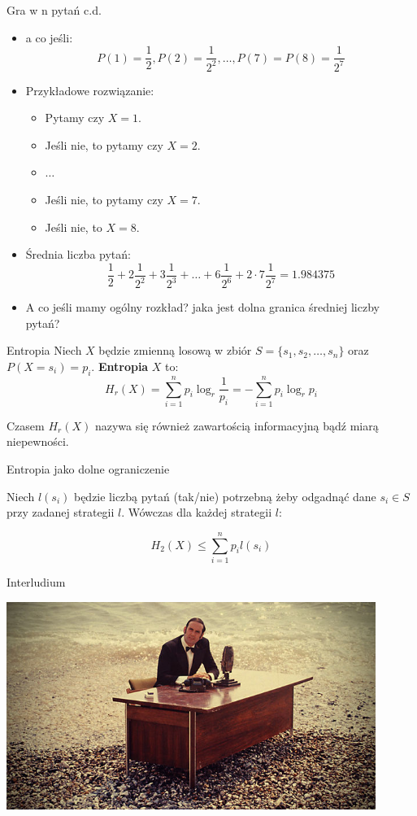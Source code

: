 \documentclass{beamer}
\begin{document}
\begin{frame}{Gra w n pytań c.d.}

\begin{itemize}
  \item a co jeśli:
  $$
  P(1) = \frac{1}{2}, P(2) = \frac{1}{2^2}, \ldots, P(7) = P(8) = \frac{1}{2^7}
  $$
  \pause
  \item Przykładowe rozwiązanie:
  \begin{itemize}
    \item Pytamy czy $X=1$.
    \item Jeśli nie, to pytamy czy $X=2$.
    \item $\ldots$
    \item Jeśli nie, to pytamy czy $X=7$.
    \item Jeśli nie, to $X=8$.
  \end{itemize}
  \item Średnia liczba pytań:
  $$\frac{1}{2} + 2 \frac{1}{2^2} + 3 \frac{1}{2^3} + \ldots + 6 \frac{1}{2^6} +2 \cdot 7 \frac{1}{2^7} = 1.984375$$
  \item A co jeśli mamy ogólny rozkład? jaka jest dolna granica średniej liczby pytań?
\end{itemize}
\end{frame}


\begin{frame}{Entropia}
Niech $X$ będzie zmienną losową w zbiór $S = \{s_1, s_2, \ldots, s_n\}$
oraz $P(X=s_i) = p_i$. \textbf{Entropia} $X$ to:
$$
H_r(X) = \sum_{i=1}^{n} p_i \log_{r}{\frac{1}{p_i}} = - \sum_{i=1}^{n} p_i \log_{r}{p_i}
$$

Czasem $H_r(X)$ nazywa się również zawartością informacyjną bądź miarą niepewności.
\end{frame}

\begin{frame}{Entropia jako dolne ograniczenie}

Niech $l(s_i)$ będzie liczbą pytań (tak/nie) potrzebną żeby odgadnąć
dane $s_i \in S$ przy zadanej strategii $l$. Wówczas dla każdej
strategii $l$:

$$
H_2(X) \leq \sum_{i=1}^{n} p_i l(s_i)
$$

\end{frame}


\begin{frame}{Interludium}
\begin{center}
\includegraphics[width=0.9\textwidth]{img/cleese-at-ocean-desk.jpg}
\end{center}
\end{frame}
\end{document}
